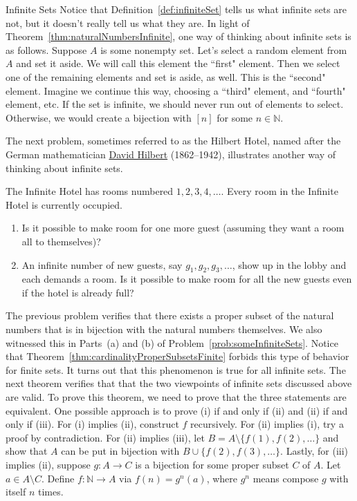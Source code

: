 \begin{section}{Infinite Sets}
Notice that Definition~\ref{def:infiniteSet} tells us what infinite sets are not, but it doesn't really tell us what they are. In light of Theorem~\ref{thm:naturalNumbersInfinite}, one way of thinking about infinite sets is as follows.  Suppose $A$ is some nonempty set. Let's select a random element from $A$ and set it aside. We will call this element the ``first" element.  Then we select one of the remaining elements and set is aside, as well.  This is the ``second" element.  Imagine we continue this way, choosing a ``third" element, and ``fourth" element, etc.  If the set is infinite, we should never run out of elements to select. Otherwise, we would create a bijection with $[n]$ for some $n\in\mathbb{N}$.

The next problem, sometimes referred to as the Hilbert Hotel, named after the German mathematician \href{https://en.wikipedia.org/wiki/David_Hilbert}{David Hilbert} (1862--1942), illustrates another way of thinking about infinite sets.

\begin{problem}
The Infinite Hotel has rooms numbered $1,2,3,4,\ldots$. Every room in the Infinite Hotel is currently occupied.  
\begin{enumerate}[label=\textrm{(\roman*)}]
\item Is it possible to make room for one more guest (assuming they want a room all to themselves)? 
\item An infinite number of new guests, say $g_1, g_2,g_3,\ldots$, show up in the lobby and each demands a room.  Is it possible to make room for all the new guests even if the hotel is already full?
\end{enumerate}
\end{problem}

The previous problem verifies that there exists a proper subset of the natural numbers that is in bijection with the natural numbers themselves. We also witnessed this in Parts~(a) and (b) of Problem~\ref{prob:someInfiniteSets}. Notice that Theorem~\ref{thm:cardinalityProperSubsetsFinite} forbids this type of behavior for finite sets. It turns out that this phenomenon is true for all infinite sets. The next theorem verifies that that the two viewpoints of infinite sets discussed above are valid. To prove this theorem, we need to prove that the three statements are equivalent. One possible approach is to prove (i) if and only if (ii) and (ii) if and only if (iii). For (i) implies (ii), construct $f$ recursively. For (ii) implies (i), try a proof by contradiction. For (ii) implies (iii), let $B=A\setminus \{f(1),f(2),\ldots\}$ and show that $A$ can be put in bijection with $B\cup\{f(2),f(3),\ldots\}$. Lastly, for (iii) implies (ii), suppose $g:A\to C$ is a bijection for some proper subset $C$ of $A$. Let $a\in A\setminus C$. Define $f:\mathbb{N}\to A$ via $f(n)=g^n(a)$, where $g^n$ means compose $g$ with itself $n$ times.


\end{section}
